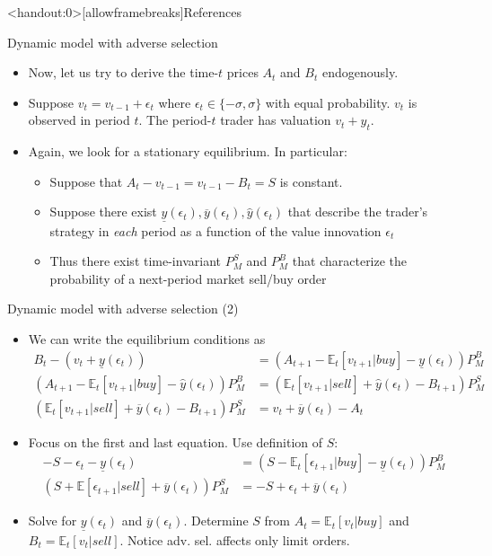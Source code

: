\documentclass[english,10pt
,aspectratio=169
]{beamer}
\begin{document}
\appendix
\begin{frame}<handout:0>[allowframebreaks]{References}


\end{frame}


\begin{frame}[label=adverse]{Dynamic model with adverse selection}
	\begin{itemize}
		\item Now, let us try to derive the time-$t$ prices $A_t$ and $B_t$ endogenously. 
		\item Suppose $v_t=v_{t-1}+\epsilon_t$ where $\epsilon_t \in \{-\sigma, \sigma \}$ with equal probability. $v_t$ is observed in period $t$. The period-$t$ trader has valuation $v_t+y_t$. 
		\item Again, we look for a stationary equilibrium. In particular:
		\begin{itemize}
			\item Suppose that $A_t-v_{t-1}=v_{t-1}-B_t=S$ is constant.
			\item Suppose there exist $\underline{y}(\epsilon_t),\overline{y}(\epsilon_t),\hat{y}(\epsilon_t)$  that describe the trader's strategy in \textit{each} period  as a function of the value innovation $\epsilon_t$ 
			\item Thus there exist time-invariant $P^S_M$ and $P^B_M$ that characterize the probability of a next-period market sell/buy order 
		\end{itemize}
	\end{itemize}
\end{frame}


\begin{frame}{Dynamic model with adverse selection (2)}
	\begin{itemize}
		\item We can write the equilibrium conditions as
		\begin{align*}
		B_t-(v_t+\underline{y}(\epsilon_t)) 					& = (A_{t+1}-\mathbb{E}_t[v_{t+1}|buy]-\underline{y}(\epsilon_t) 	)P^B_M \\
		(A_{t+1}-\mathbb{E}_t[v_{t+1}|buy]-\hat{y}(\epsilon_t))P^B_M 			& = (\mathbb{E}_t[v_{t+1}|sell]+\hat{y}(\epsilon_t)-B_{t+1})P^S_M  \\
		(\mathbb{E}_t[v_{t+1}|sell]+\overline{y}(\epsilon_t)-B_{t+1}) P^S_M  	& = v_t+\overline{y}(\epsilon_t)-A_t 
		\end{align*}
		\item Focus on the first and last equation. Use definition of $S$:
		\begin{align*}
		-S-\epsilon_t-\underline{y}(\epsilon_t) 					& = (S-\mathbb{E}_t[\epsilon_{t+1}|buy]-\underline{y}(\epsilon_t) 	)P^B_M \\
		(S+\mathbb{E}[\epsilon_{t+1}|sell]+\overline{y}(\epsilon_t)) P^S_M  	& =-S+\epsilon_t+\overline{y}(\epsilon_t)
		\end{align*}
		\item Solve for $\underline{y}(\epsilon_t)$ and $\overline{y}(\epsilon_t)$. Determine $S$ from $A_t=\mathbb{E}_t[v_t|buy]$ and $B_t= \mathbb{E}_t[v_t|sell]$. Notice adv. sel. affects only limit orders. \hyperlink{parlourmain}{}
	\end{itemize}
\end{frame}
\end{document}
